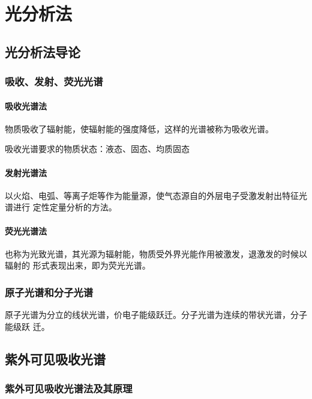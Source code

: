 \chapter{光分析法}

\section{光分析法导论}

\subsection{吸收、发射、荧光光谱}

\subsubsection{吸收光谱法}

物质吸收了辐射能，使辐射能的强度降低，这样的光谱被称为吸收光谱。

吸收光谱要求的物质状态：液态、固态、均质固态

\subsubsection{发射光谱法}

以火焰、电弧、等离子炬等作为能量源，使气态源自的外层电子受激发射出特征光谱进行
定性定量分析的方法。

\subsubsection{荧光光谱法}

也称为光致光谱，其光源为辐射能，物质受外界光能作用被激发，退激发的时候以辐射的
形式表现出来，即为荧光光谱。


\subsection{原子光谱和分子光谱}

原子光谱为分立的线状光谱，价电子能级跃迁。分子光谱为连续的带状光谱，分子能级跃
迁。

\section{紫外可见吸收光谱}

\subsection{紫外可见吸收光谱法及其原理}


